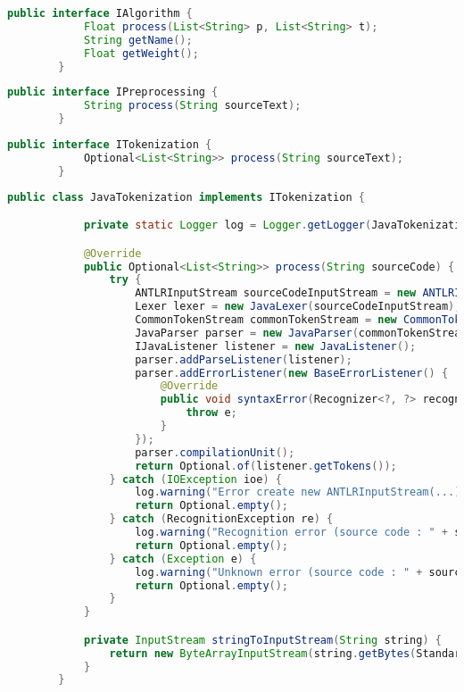     \newpage
    \begin{lstlisting}[language=java]                
        public interface IAlgorithm {
            Float process(List<String> p, List<String> t);
            String getName();
            Float getWeight();
        }
    \end{lstlisting}

    \begin{lstlisting}[language=java]                
        public interface IPreprocessing {
            String process(String sourceText);
        } 
    \end{lstlisting}


    \begin{lstlisting}[language=java]                
        public interface ITokenization {
            Optional<List<String>> process(String sourceText);
        }
    \end{lstlisting}

    \newpage
    \begin{lstlisting}[language=java]                
            public class JavaTokenization implements ITokenization {

            private static Logger log = Logger.getLogger(JavaTokenization.class.getName());

            @Override
            public Optional<List<String>> process(String sourceCode) {
                try {
                    ANTLRInputStream sourceCodeInputStream = new ANTLRInputStream(stringToInputStream(sourceCode));
                    Lexer lexer = new JavaLexer(sourceCodeInputStream);
                    CommonTokenStream commonTokenStream = new CommonTokenStream(lexer);
                    JavaParser parser = new JavaParser(commonTokenStream);
                    IJavaListener listener = new JavaListener();
                    parser.addParseListener(listener);
                    parser.addErrorListener(new BaseErrorListener() {
                        @Override
                        public void syntaxError(Recognizer<?, ?> recognizer, Object offendingSymbol, int line, int charPositionInLine, String msg, RecognitionException e) {
                            throw e;
                        }
                    });
                    parser.compilationUnit();
                    return Optional.of(listener.getTokens());
                } catch (IOException ioe) {
                    log.warning("Error create new ANTLRInputStream(...)");
                    return Optional.empty();
                } catch (RecognitionException re) {
                    log.warning("Recognition error (source code : " + sourceCode.replace("\n", " "));
                    return Optional.empty();
                } catch (Exception e) {
                    log.warning("Unknown error (source code : " + sourceCode.replace("\n", " "));
                    return Optional.empty();
                }
            }

            private InputStream stringToInputStream(String string) {
                return new ByteArrayInputStream(string.getBytes(StandardCharsets.UTF_8));
            }
        }
    \end{lstlisting}


